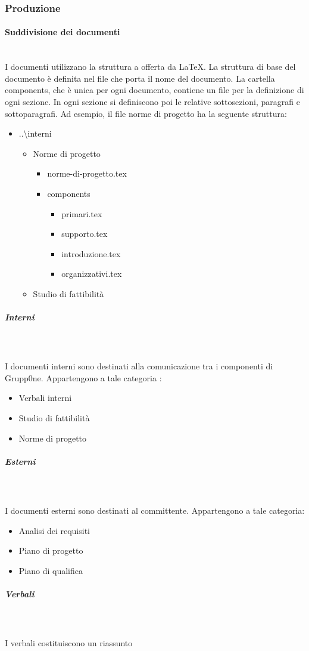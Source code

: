\documentclass[../norme-di-progetto.tex]{subfiles}
\begin{document}
\subsubsection{Produzione}
\paragraph{Suddivisione dei documenti}\mbox{}\\
I documenti utilizzano la struttura a  offerta da \LaTeX. La struttura di base del documento è definita nel file che porta il nome del documento. La cartella components, che è unica per ogni documento, contiene un file per la definizione di ogni sezione. In ogni sezione si definiscono poi le relative sottosezioni, paragrafi e sottoparagrafi.
Ad esempio, il file norme di progetto ha la seguente struttura:
\begin{itemize}
	\item ..\textbackslash interni
	\begin{itemize}
	\item Norme di progetto
		 \begin{itemize}
		 	\item norme-di-progetto.tex
		 	\item components
		 	\begin{itemize}
		 		\item primari.tex
		 		\item supporto.tex
		 		\item introduzione.tex
		 		\item organizzativi.tex
		 	\end{itemize}
		 \end{itemize}
	\item Studio di fattibilità
	\end{itemize}
\end{itemize}
\subparagraph{Interni}\mbox{}\\
\label{subp:interni}
\\ I documenti interni sono destinati alla comunicazione tra i componenti di Grupp0ne. Appartengono a tale categoria :
\begin{itemize}
	\item Verbali interni
	\item Studio di fattibilità
	\item Norme di progetto
\end{itemize}
\subparagraph{Esterni}\mbox{}\\
\label{subp:esterni}
\\ I documenti esterni sono destinati al committente. Appartengono a tale categoria:
\begin{itemize}
	\item Analisi dei requisiti
	\item Piano di progetto
	\item Piano di qualifica
\end{itemize}
\subparagraph{Verbali}\mbox{}\\
\label{subp:verbali}
\\ I verbali costituiscono un riassunto 
\end{document}
